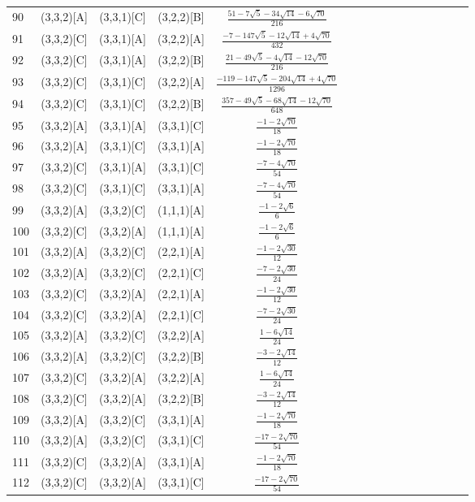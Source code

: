 \documentclass[11pt]{article}
\begin{document}
\begin{longtable}{ | p{1cm}| *{15}{c|} }
90 & (3,3,2)[A] & (3,3,1)[C] & (3,2,2)[B] & $\frac{51-7\sqrt{5}-34\sqrt{14}-6\sqrt{70}}{216}$\\ %
91 & (3,3,2)[C] & (3,3,1)[A] & (3,2,2)[A] & $\frac{-7-147\sqrt{5}-12\sqrt{14}+4\sqrt{70}}{432}$\\ %
92 & (3,3,2)[C] & (3,3,1)[A] & (3,2,2)[B] & $\frac{21-49\sqrt{5}-4\sqrt{14}-12\sqrt{70}}{216}$\\ %
93 & (3,3,2)[C] & (3,3,1)[C] & (3,2,2)[A] & $\frac{-119-147\sqrt{5}-204\sqrt{14}+4\sqrt{70}}{1296}$\\ %
94 & (3,3,2)[C] & (3,3,1)[C] & (3,2,2)[B] & $\frac{357-49\sqrt{5}-68\sqrt{14}-12\sqrt{70}}{648}$\\ %
95 & (3,3,2)[A] & (3,3,1)[A] & (3,3,1)[C] & $\frac{-1-2\sqrt{70}}{18}$\\ %
96 & (3,3,2)[A] & (3,3,1)[C] & (3,3,1)[A] & $\frac{-1-2\sqrt{70}}{18}$\\ %
97 & (3,3,2)[C] & (3,3,1)[A] & (3,3,1)[C] & $\frac{-7-4\sqrt{70}}{54}$\\ %
98 & (3,3,2)[C] & (3,3,1)[C] & (3,3,1)[A] & $\frac{-7-4\sqrt{70}}{54}$\\ %
99 & (3,3,2)[A] & (3,3,2)[C] & (1,1,1)[A] & $\frac{-1-2\sqrt{6}}{6}$\\ %
100 & (3,3,2)[C] & (3,3,2)[A] & (1,1,1)[A] & $\frac{-1-2\sqrt{6}}{6}$\\ %
101 & (3,3,2)[A] & (3,3,2)[C] & (2,2,1)[A] & $\frac{-1-2\sqrt{30}}{12}$\\ %
102 & (3,3,2)[A] & (3,3,2)[C] & (2,2,1)[C] & $\frac{-7-2\sqrt{30}}{24}$\\ %
103 & (3,3,2)[C] & (3,3,2)[A] & (2,2,1)[A] & $\frac{-1-2\sqrt{30}}{12}$\\ %
104 & (3,3,2)[C] & (3,3,2)[A] & (2,2,1)[C] & $\frac{-7-2\sqrt{30}}{24}$\\ %
105 & (3,3,2)[A] & (3,3,2)[C] & (3,2,2)[A] & $\frac{1-6\sqrt{14}}{24}$\\ %
106 & (3,3,2)[A] & (3,3,2)[C] & (3,2,2)[B] & $\frac{-3-2\sqrt{14}}{12}$\\ %
107 & (3,3,2)[C] & (3,3,2)[A] & (3,2,2)[A] & $\frac{1-6\sqrt{14}}{24}$\\ %
108 & (3,3,2)[C] & (3,3,2)[A] & (3,2,2)[B] & $\frac{-3-2\sqrt{14}}{12}$\\ %
109 & (3,3,2)[A] & (3,3,2)[C] & (3,3,1)[A] & $\frac{-1-2\sqrt{70}}{18}$\\ %
110 & (3,3,2)[A] & (3,3,2)[C] & (3,3,1)[C] & $\frac{-17-2\sqrt{70}}{54}$\\ %
111 & (3,3,2)[C] & (3,3,2)[A] & (3,3,1)[A] & $\frac{-1-2\sqrt{70}}{18}$\\ %
112 & (3,3,2)[C] & (3,3,2)[A] & (3,3,1)[C] & $\frac{-17-2\sqrt{70}}{54}$\\ %
\end{longtable}
\end{document}
